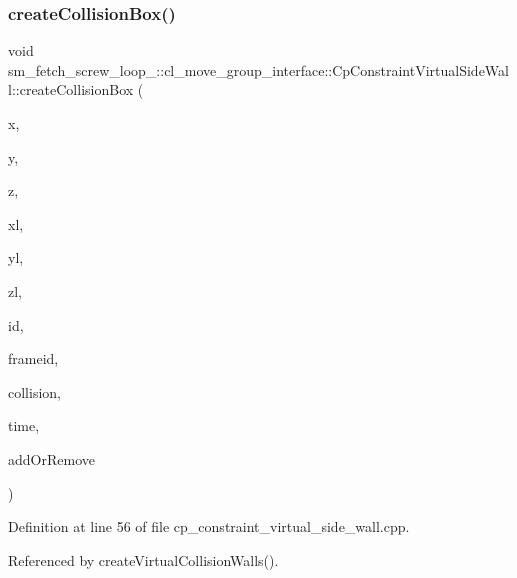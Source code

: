\subsubsection{\texorpdfstring{create\+Collision\+Box()}{createCollisionBox()}}
{\footnotesize\ttfamily void sm\+\_\+fetch\+\_\+screw\+\_\+loop\+\_\+::cl\+\_\+move\+\_\+group\+\_\+interface\+::\+Cp\+Constraint\+Virtual\+Side\+Wall\+::create\+Collision\+Box (\begin{DoxyParamCaption}\item[{float}]{x,  }\item[{float}]{y,  }\item[{float}]{z,  }\item[{float}]{xl,  }\item[{float}]{yl,  }\item[{float}]{zl,  }\item[{std\+::string}]{id,  }\item[{std\+::string}]{frameid,  }\item[{moveit\+\_\+msgs\+::\+Collision\+Object \&}]{collision,  }\item[{const ros\+::\+Time \&}]{time,  }\item[{int}]{add\+Or\+Remove }\end{DoxyParamCaption})}



Definition at line 56 of file cp\+\_\+constraint\+\_\+virtual\+\_\+side\+\_\+wall.\+cpp.



Referenced by create\+Virtual\+Collision\+Walls().


